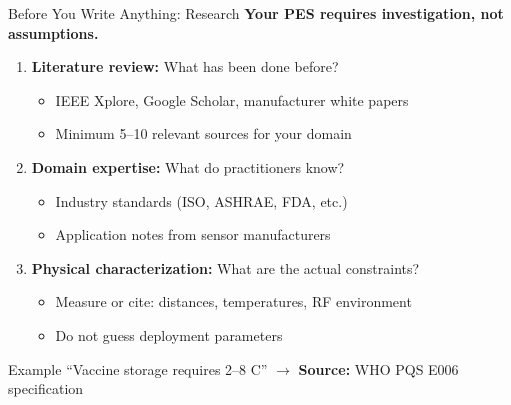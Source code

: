 \documentclass[aspectratio=169,11pt]{beamer}
\begin{document}
\begin{frame}{Before You Write Anything: Research}
    \textbf{Your PES requires investigation, not assumptions.}
    
    \vspace{0.3cm}
    \begin{enumerate}
        \item \textbf{Literature review:} What has been done before?
        \begin{itemize}
            \item IEEE Xplore, Google Scholar, manufacturer white papers
            \item Minimum 5--10 relevant sources for your domain
        \end{itemize}
        
        \item \textbf{Domain expertise:} What do practitioners know?
        \begin{itemize}
            \item Industry standards (ISO, ASHRAE, FDA, etc.)
            \item Application notes from sensor manufacturers
        \end{itemize}
        
        \item \textbf{Physical characterization:} What are the actual constraints?
        \begin{itemize}
            \item Measure or cite: distances, temperatures, RF environment
            \item Do not guess deployment parameters
        \end{itemize}
    \end{enumerate}
    
    \vspace{0.3cm}
    \begin{block}{Example}
        ``Vaccine storage requires 2--8 C'' $\rightarrow$ \textbf{Source:} WHO PQS E006 specification
    \end{block}
\end{frame}
\end{document}
